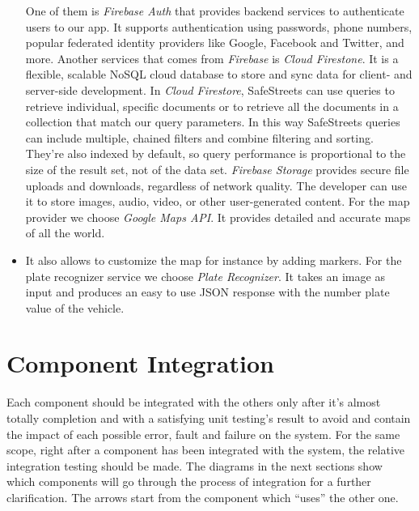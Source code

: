 \documentclass[../RASD.tex]{subfiles}
\begin{document}
\begin{itemize}
        One of them is \textit{Firebase Auth} that provides backend services to authenticate users to our app.
        It supports authentication using passwords, phone numbers, popular federated identity providers like Google, Facebook and Twitter, and more.
        Another services that comes from \textit{Firebase} is \textit{Cloud Firestone}.
        It is a flexible, scalable NoSQL cloud database to store and sync data for client- and server-side development.
        In \textit{Cloud Firestore}, SafeStreets can use queries to retrieve individual, specific documents or to retrieve all the documents
        in a collection that match our query parameters.
        In this way SafeStreets queries can include multiple, chained filters and combine filtering and sorting.
        They're also indexed by default, so query performance is proportional to the size of the result set, not of the data set.
        \textit{Firebase Storage} provides secure file uploads and downloads, regardless of network quality.
        The developer can use it to store images, audio, video, or other user-generated content.
        For the map provider we choose \textit{Google Maps API}.
        It provides detailed and accurate maps of all the world.
        \item It also allows to customize the map for instance by adding markers.
        For the plate recognizer service we choose \textit{Plate Recognizer}.
        It takes an image as input and produces an easy to use JSON response with the number plate value of the vehicle.
    \end{itemize}
    \newpage
    \section{Component Integration}\label{sec:component-integration}
    Each component should be integrated with the others only after it’s almost totally completion and with a satisfying unit testing’s result
    to avoid and contain the impact of each possible error, fault and failure on the system.
    For the same scope, right after a component has been integrated with the system, the relative integration testing should be made.
    The diagrams in the next sections show which components will go through the process of integration for a further clarification.
    The arrows start from the component which “uses” the other one.
\end{document}
